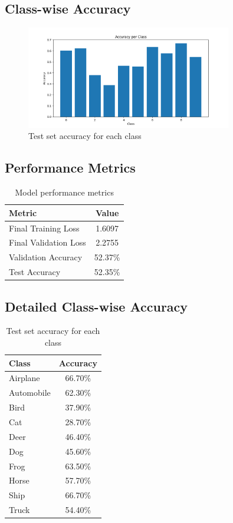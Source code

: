 \documentclass[12pt]{article}
\begin{document}
\subsection{Class-wise Accuracy}
\begin{figure}[H]
    \centering
    \includegraphics[width=0.8\textwidth]{results/class_accuracies.png}
    \caption{Test set accuracy for each class}
    \label{fig:class_acc}
\end{figure}

\subsection{Performance Metrics}
\begin{table}[H]
    \centering
    \begin{tabular}{lc}
        \toprule
        Metric & Value \\
        \midrule
        Final Training Loss & 1.6097 \\
        Final Validation Loss & 2.2755 \\
        Validation Accuracy & 52.37\% \\
        Test Accuracy & 52.35\% \\
        \bottomrule
    \end{tabular}
    \caption{Model performance metrics}
    \label{tab:metrics}
\end{table}

\subsection{Detailed Class-wise Accuracy}
\begin{table}[H]
    \centering
    \begin{tabular}{lc}
        \toprule
        Class & Accuracy \\
        \midrule
        Airplane & 66.70\% \\
        Automobile & 62.30\% \\
        Bird & 37.90\% \\
        Cat & 28.70\% \\
        Deer & 46.40\% \\
        Dog & 45.60\% \\
        Frog & 63.50\% \\
        Horse & 57.70\% \\
        Ship & 66.70\% \\
        Truck & 54.40\% \\
        \bottomrule
    \end{tabular}
    \caption{Test set accuracy for each class}
    \label{tab:class_acc}
\end{table}
\end{document}
